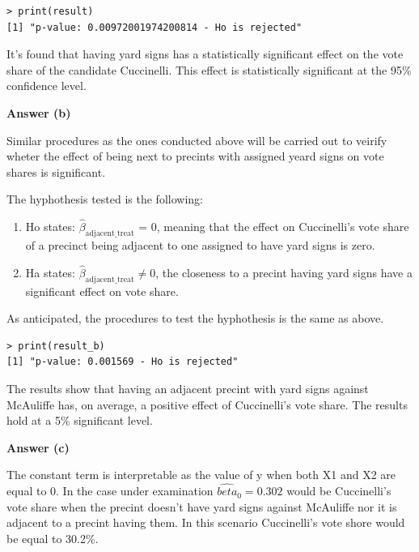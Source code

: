 \documentclass[12pt,letterpaper]{article}
\begin{document}
 
\begin{verbatim}
> print(result)
[1] "p-value: 0.00972001974200814 - Ho is rejected"
\end{verbatim}

\noindent It's found that having yard signs has a statistically significant effect on the vote share of the candidate Cuccinelli. This effect is statistically significant at the 95\% confidence level.

\vspace{0.5cm}
\noindent\textbf{Answer (b)}\\
\vspace{0.5cm}

\noindent Similar procedures as the ones conducted above will be carried out to veirify wheter the effect of being next to precints with assigned yeard signs on vote shares is significant. 

\noindent The hyphothesis tested is the following:
\begin{enumerate}
	\item Ho states: $\hat{\beta}_{\text{adjacent\_treat}}$ = 0, meaning that the effect on Cuccinelli’s vote share of a precinct being adjacent to one assigned to have yard signs is zero.\\
	\item Ha states: $\hat{\beta}_{\text{adjacent\_treat}} \ne 0$, the closeness to a precint having yard signs have a significant effect on vote share.\\ 
\end{enumerate}

\noindent As anticipated, the procedures to test the hyphothesis is the same as above. 

 
\begin{verbatim}
> print(result_b)
[1] "p-value: 0.001569 - Ho is rejected"
\end{verbatim}

\noindent The results show that having an adjacent precint with yard signs against McAuliffe has, on average, a positive effect of Cuccinelli's vote share. The results hold at a 5\% significant level.


\vspace{0.5cm}
\noindent\textbf{Answer (c)}\\
\vspace{0.5cm}

\noindent The constant term is interpretable as the value of y when both X1 and X2 are equal to 0. In the case under examination $\hat{beta}_0 = 0.302$ would be Cuccinelli's vote share when the precint doesn't have yard signs against McAuliffe nor it is adjacent to a precint having them. In this scenario Cuccinelli's vote shore would be equal to 30.2\%. 
\end{document}
